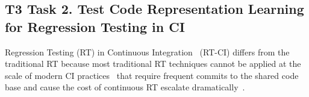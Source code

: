 \subsection{T3 Task 2. Test Code Representation Learning for Regression Testing in CI}

%
Regression Testing (RT) in Continuous
Integration~\cite{duvall2007continuous} (RT-CI) differs from the
traditional RT because most traditional RT techniques cannot be
applied at the scale of modern CI
practices~\cite{elbaum2014techniques} that require frequent commits to
the shared code base and cause the cost of continuous RT escalate
dramatically~\cite{memon2017taming}.
%
%



